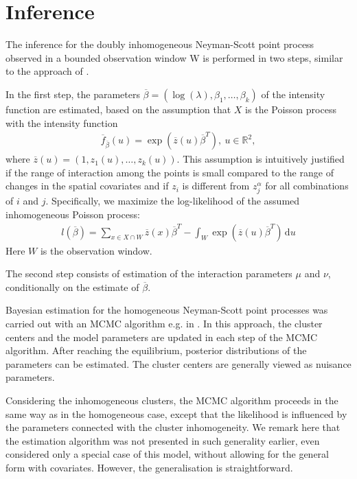 \section{Inference} \label{MCMC}
The inference for the doubly inhomogeneous Neyman-Scott point process observed in a bounded observation window W is performed in two steps, similar to the approach of \cite{WG2009}.

In the first step, the parameters $\overline{\beta}=(\log (\lambda)
,\beta_1, \ldots, \beta_k)$ of the intensity function are estimated, based on the assumption that $X$ is the
Poisson process with the intensity function
\begin{align} \label{aprox} \overline{f}_{\overline{\beta}}
(u) =  \exp (\overline z(u) \overline \beta^T), \  u \in \mathbb R^2,
\end{align}
    where $\overline z(u) = (1, z_1(u), \ldots , z_k(u))$.
This assumption is intuitively justified if the range of interaction among the points is small compared to the range of changes in the spatial covariates and if $z_i$ is different from $z_j^\alpha$ for all combinations of $i$ and $j$.
Specifically, we maximize the log-likelihood of the assumed inhomogeneous Poisson process:
\begin{align}
    l(\overline{\beta})=\sum_{x\in X \cap W}
    \overline z(x)\overline{\beta}^T - \int_W \exp (\overline z(u)\overline{\beta}^T)
    \, \mathrm{d}u
\end{align}
Here $W$ is the observation window.

The second step consists of estimation of the interaction parameters $\mu$
and $\nu$, conditionally on the estimate of $\overline{\beta}$. 

Bayesian estimation for the homogeneous Neyman-Scott point processes was carried out with an MCMC algorithm e.g. in \cite{GT2012, MW2007, M2014, KM2016}. In this approach, the cluster centers and the model parameters are updated in each step of the MCMC algorithm. After reaching the equilibrium, posterior distributions of the parameters can be estimated. The cluster centers are generally viewed as nuisance parameters.

Considering the inhomogeneous clusters, the MCMC algorithm proceeds in the same way as in the homogeneous case, except that the likelihood is influenced by the parameters connected with the cluster inhomogeneity. We remark here that the estimation algorithm was not presented in such generality earlier, even \cite{MS2017} considered only a special case of this model, without allowing for the general form with covariates. However, the generalisation is straightforward.


